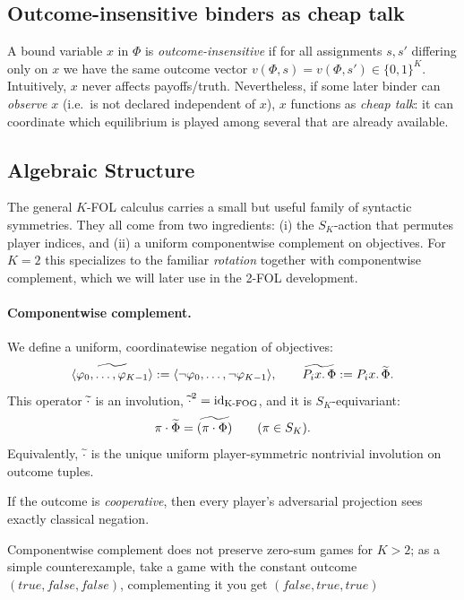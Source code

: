 \subsection{Outcome-insensitive binders as cheap talk}
\label{sec:cheap-talk}
A bound variable $x$ in $\Phi$ is \emph{outcome-insensitive} if for all assignments $s,s'$ differing only on $x$ we have the same outcome vector $v(\Phi,s)=v(\Phi,s')\in\{0,1\}^K$. Intuitively, $x$ never affects payoffs/truth. Nevertheless, if some later binder can \emph{observe} $x$ (i.e.\ is not declared independent of $x$), $x$ functions as \emph{cheap talk}: it can coordinate which equilibrium is played among several that are already available.

\subsection{Algebraic Structure}
The general $K$-FOL calculus carries a small but useful family of
syntactic symmetries. They all come from two ingredients:
(i) the $S_K$-action that permutes player indices, and
(ii) a uniform componentwise complement on objectives.
For $K=2$ this specializes to the familiar \emph{rotation} together with
componentwise complement, which we will later use in the 2-FOL development.

\paragraph{Componentwise complement.}
We define a uniform, coordinatewise negation of objectives:
\[
\widetilde{\langle \varphi_0,\dots,\varphi_{K-1} \rangle}
  := \langle \neg \varphi_0,\dots,\neg \varphi_{K-1} \rangle,
  \qquad
\widetilde{P_i x.\,\Phi} := P_i x.\,\widetilde{\Phi}.
\]
This operator $\widetilde{\cdot}$ is an involution, $\widetilde{\cdot}^2 = \mathrm{id}_{\mathrm{K\text{-}FOG}}$, and it is
$S_K$-equivariant:
\[
\pi \cdot \widetilde{\Phi} = \widetilde{(\pi \cdot \Phi)} \qquad (\pi \in S_K).
\]
Equivalently, $\widetilde{\cdot}$ is the unique uniform player-symmetric nontrivial
involution on outcome tuples.

\begin{remark}
If the outcome is \emph{cooperative}, then every player's adversarial projection sees exactly classical negation.
\end{remark}

\begin{remark}
\label{rem:no-zero-sum-preservation}
Componentwise complement does not preserve zero-sum games for $K>2$; as a simple counterexample, take a game with the constant outcome $(true, false, false)$, complementing it you get $(false, true, true)$
\end{remark}

